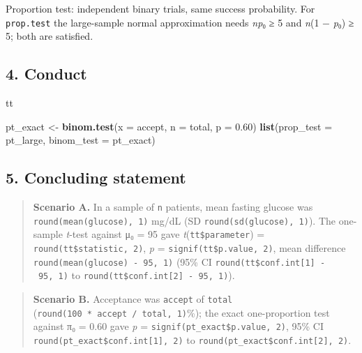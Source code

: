 \documentclass[
]{article}
\newenvironment{Shaded}{\begin{snugshade}}{\end{snugshade}}
\newcommand{\AttributeTok}[1]{\textcolor[rgb]{0.13,0.29,0.53}{#1}}
\newcommand{\FloatTok}[1]{\textcolor[rgb]{0.00,0.00,0.81}{#1}}
\newcommand{\FunctionTok}[1]{\textcolor[rgb]{0.13,0.29,0.53}{\textbf{#1}}}
\newcommand{\NormalTok}[1]{#1}
\newcommand{\OtherTok}[1]{\textcolor[rgb]{0.56,0.35,0.01}{#1}}
\begin{document}
Proportion test: independent binary trials, same success probability.
For \texttt{prop.test} the large-sample normal approximation needs
\emph{np}₀ ≥ 5 and \emph{n}(1 − \emph{p}₀) ≥ 5; both are satisfied.

\subsection{4. Conduct}\label{conduct}

\begin{Shaded}
\begin{Highlighting}[]
\NormalTok{tt}
\end{Highlighting}
\end{Shaded}

\begin{Shaded}
\begin{Highlighting}[]
\NormalTok{pt\_exact }\OtherTok{\textless{}{-}} \FunctionTok{binom.test}\NormalTok{(}\AttributeTok{x =}\NormalTok{ accept, }\AttributeTok{n =}\NormalTok{ total, }\AttributeTok{p =} \FloatTok{0.60}\NormalTok{)}
\FunctionTok{list}\NormalTok{(}\AttributeTok{prop\_test =}\NormalTok{ pt\_large, }\AttributeTok{binom\_test =}\NormalTok{ pt\_exact)}
\end{Highlighting}
\end{Shaded}

\subsection{5. Concluding statement}\label{concluding-statement}

\begin{quote}
\textbf{Scenario A.} In a sample of \texttt{n} patients, mean fasting
glucose was \texttt{round(mean(glucose),\ 1)} mg/dL (SD
\texttt{round(sd(glucose),\ 1)}). The one-sample \emph{t}-test against
μ₀ = 95 gave \emph{t}(\texttt{tt\$parameter}) =
\texttt{round(tt\$statistic,\ 2)}, \emph{p} =
\texttt{signif(tt\$p.value,\ 2)}, mean difference
\texttt{round(mean(glucose)\ -\ 95,\ 1)} (95\% CI
\texttt{round(tt\$conf.int{[}1{]}\ -\ 95,\ 1)} to
\texttt{round(tt\$conf.int{[}2{]}\ -\ 95,\ 1)}).
\end{quote}

\begin{quote}
\textbf{Scenario B.} Acceptance was \texttt{accept} of \texttt{total}
(\texttt{round(100\ *\ accept\ /\ total,\ 1)}\%); the exact
one-proportion test against π₀ = 0.60 gave \emph{p} =
\texttt{signif(pt\_exact\$p.value,\ 2)}, 95\% CI
\texttt{round(pt\_exact\$conf.int{[}1{]},\ 2)} to
\texttt{round(pt\_exact\$conf.int{[}2{]},\ 2)}.
\end{quote}
\end{document}
